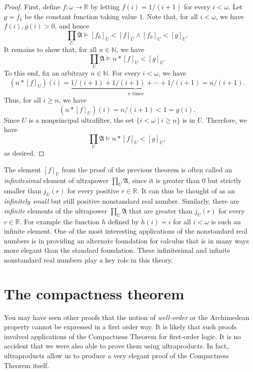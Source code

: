 \documentclass[a4paper]{memoir}
\theoremstyle{definition}
\newcommand{\bb}{\mathbb}
\newcommand{\ra}{\rightarrow}
\begin{document}
\begin{proof}
  First, define $f:\omega \ra \bb{R}$ by letting $f(i) = 1/(i+1)$ for every $i < \omega$.
  Let $g = f_1$ be the constant function taking value $1$. Note that, for all $i < \omega$, 
  we have $f(i), g(i) > 0$, and hence
  \[
    \prod_U \mathfrak{A} \models [f_0]_U < [f]_U \wedge [f_0]_U < [g]_U.
  \]
  It remains to show that, for all $n \in \bb{N}$, we have
  \[
    \prod_U \mathfrak{A} \models n \ast [f]_U < [g]_U.
  \]
  To this end, fix an arbitrary $n \in \bb{N}$. For every $i < \omega$, we have 
  \[
    (n \ast [f]_U)(i) = \underbrace{1/(i+1) + 1/(i+1) + \cdots + 1/(i+1)}_{\text{$n$ times}} 
    = n/(i+1).
  \]
  Thus, for all $i \geq n$, we have
  \[
    (n \ast [f]_U)(i) = n/(i+1) < 1 = g(i).
  \]
  Since $U$ is a nonprincipal ultrafilter, the set $\{i < \omega \mid i \geq n\}$ is in $U$. 
  Therefore, we have
  \[
    \prod_U \mathfrak{A} \models n \ast [f]_U < [g]_U,
  \]
  as desired.
\end{proof}

The element $[f]_U$ from the proof of the previous theorem is often called an \emph{infinitesimal} 
element of ultrapower $\prod_U \mathfrak{A}$, since it is greater than $0$ but strictly 
smaller than $j_U(r)$ for every positive $r \in \bb{R}$. It can thus be thought of as an 
\emph{infinitely small} but still positive nonstandard real number. Similarly, there are 
\emph{infinite} elements of the ultrapower $\prod_U \mathfrak{A}$ that are greater than 
$j_U(r)$ for every $r \in \bb{R}$. For example the function $h$ defined by 
$h(i) = i$ for all $i < \omega$ is such an infinite element. One of the most interesting applications 
of the nonstandard real numbers is in providing an alternate foundation for calculus that is in many 
ways more elegant than the standard foundation. These infinitesimal and infinite nonstandard 
real numbers play a key role in this theory.

\section{The compactness theorem}

You may have seen other proofs that the notion of \emph{well-order} or the Archimedean property 
cannot be expressed in a first order way. It is likely that such proofs involved applications of 
the Compactness Theorem for first-order logic. It is no accident that we were also able to prove 
them using ultraproducts. In fact, ultraproducts allow us to produce a very elegant proof of the 
Compactness Theorem itself.
\end{document}
